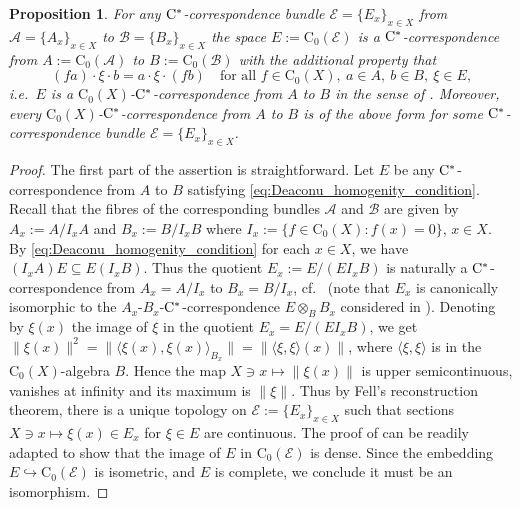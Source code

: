 \documentclass[11 pt, leqno]{amsart}
\numberwithin{equation}{section}
\theoremstyle{plain}
\newtheorem {prop}[thm] {Proposition}
\theoremstyle{definition}
\newcommand*{\contz}{\mathrm{C_0}}%
\newcommand{\B}{\mathcal B}
\newcommand{\EE}{\mathcal E}
\newcommand{\A}{\mathcal A}
\newcommand{\cst}{\ifmmode\mathrm{C}^*\else{$\mathrm{C}^*$}\fi}
\begin{document}
\begin{prop}\label{prop:correspondence_bundles_vs_C(X)_correspondence} 
For any $\cst$-correspondence bundle $\EE=\{E_x\}_{x\in X}$ from  $\A = \{ A_x \}_{x\in X}$ to $\B=\{B_x\}_{x\in X}$ the space $E := \contz(\EE)$ is a $\cst$-correspondence from $A:=\contz(\A)$ to $B:=\contz(\B)$ with the additional property that 
\begin{equation}\label{eq:Deaconu_homogenity_condition}
    (f a)\cdot   \xi\cdot  b=  a \cdot \xi\cdot  (f b)\quad  \text{for all $f\in \contz(X),\ a\in A,\ b\in B,\ \xi \in E$,}
\end{equation}
i.e.\ $E$ is a $\contz(X)$-$\cst$-correspondence from $A$ to $B$ in the sense of \cite{Deaconu}. 
Moreover, every $\contz(X)$-$\cst$-correspondence from $A$ to $B$ is of the above form for some $\cst$-correspondence bundle $\EE=\{E_x\}_{x\in X}$.
\end{prop}
\begin{proof} 
The first part of the assertion is straightforward. %
Let $E$ be any $\cst$-correspondence from $A$ to $B$ satisfying \eqref{eq:Deaconu_homogenity_condition}.
Recall that the fibres of the corresponding bundles $\A$ and $\B$ are given by $A_x:=A/I_x A$ and $B_x:=B/I_x B$ where $I_x:=\{f\in \contz(X): f(x)=0\}$, $x\in X$.
By \eqref{eq:Deaconu_homogenity_condition} for each $x\in X$, we have $(I_{x}A) E\subseteq E(I_{x}B)$. 
Thus the quotient $E_{x}:=E/(E I_x B)$ is naturally a $\cst$-correspondence from $A_x=A/I_x$ to $B_x=B/I_{x}$, cf.\ \cite[Lemma 2.3]{FMR} (note that $E_{x}$ is canonically isomorphic to the $A_x$-$B_x$-$\cst$-correspondence $E\otimes_B B_x$ considered in \cite{LeGall, Deaconu}). 
Denoting by $\xi(x)$ the image of $\xi$ in the quotient $E_{x}=E/(E I_x B)$, we get $\|\xi(x)\|^2=\|\langle \xi (x), \xi (x) \rangle_{B_x}\|=\|\langle \xi , \xi\rangle  (x) \|$, where $\langle \xi , \xi\rangle$ is in the $\contz(X)$-algebra $B$. 
Hence the map $X\ni x\mapsto \|\xi(x)\|$ is upper semicontinuous, vanishes at infinity and its maximum is $\|\xi\|$.
Thus by Fell's reconstruction theorem, there is a unique topology on  $\EE:=\{E_x\}_{x\in X}$ such that sections $X \ni x \mapsto \xi(x)\in E_x$ for $\xi\in E$ are continuous. 
The proof of \cite[Proposition C.24]{WLbook} can be readily adapted to show that the image of $E$ in $\contz(\EE)$ is dense. 
Since the embedding $E\hookrightarrow \contz(\EE)$ is isometric, and $E$ is complete, we conclude it must be an isomorphism.
\end{proof}
\end{document}
